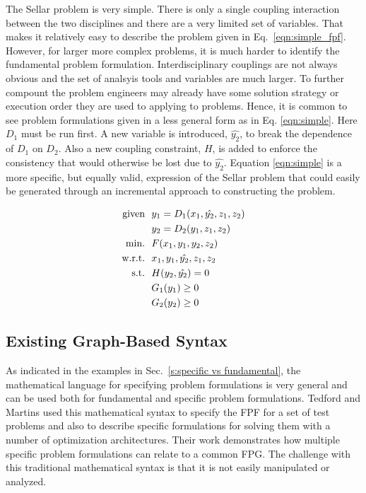     The Sellar problem is very simple. There is only a single coupling interaction 
    between the two disciplines and there are a very limited set of variables. 
    That makes it relatively easy to describe the problem given in 
    Eq.~\ref{eqn:simple_fpf}. However, for larger more complex problems, 
    it is much harder to identify the fundamental problem formulation. Interdisciplinary 
    couplings are not always obvious and the set of analsyis tools and variables are 
    much larger. To further compount the problem engineers may already have some 
    solution strategy or execution order they are used to applying to problems. 
    Hence, it is common to see problem formulations given in a less general form 
    as in Eq. \ref{eqn:simple}. Here $D_1$ must be run 
    first. A new variable is introduced, $\hat{y_2}$, to break the dependence of
    $D_1$ on $D_2$. Also a new coupling constraint, $H$, is added to enforce the 
    consistency that would otherwise be lost due to $\hat{y_2}$. Equation \ref{eqn:simple} is 
    a more specific, but equally valid, expression of the Sellar problem that could easily be 
    generated through an incremental approach to constructing the problem. 

    \begin{align}
        \textrm{given} & \ \ y_1 = D_1(x_1,\hat{y_2},z_1,z_2) \notag
        \\      & \ \ y_2 = D_2(y_1,z_1,z_2) \notag
        \\\textrm{min.} &\ \ F(x_1,y_1,y_2,z_2) \notag
        \\\textrm{w.r.t.} & \ \ x_1,y_1,\hat{y_2},z_1,z_2 \notag
        \\\textrm{s.t.} & \ \ H(y_2,\hat{y_2}) = 0 \notag 
        \\     & \ \ G_1(y_1) \geq 0 \notag
        \\     & \ \ G_2(y_2) \geq 0
        \label{eqn:simple}
    \end{align}


\subsection{Existing Graph-Based Syntax}
	\label{s:existing syntax}
    As indicated in the examples in Sec.~\ref{s:specific vs fundamental}, the mathematical 
    language for specifying problem formulations is very general and can be used both for 
    fundamental and specific problem formulations. Tedford and Martins used this mathematical syntax to specify the 
    FPF for a set of test problems and also to describe specific formulations for solving them with a 
    number of optimization architectures\cite{Tedford2009}. Their work demonstrates how multiple specific 
    problem formulations can relate to a common FPG. The challenge with this 
    traditional mathematical syntax is that it is not easily manipulated or analyzed. 

